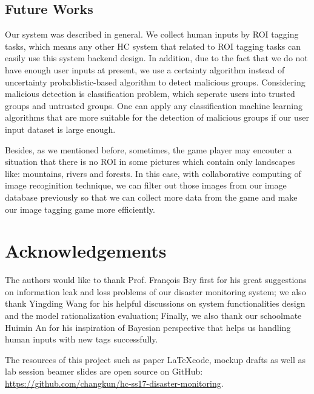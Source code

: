 \subsection{Future Works}

Our system was described in general. We collect human inputs by ROI tagging tasks, 
which means any other HC system that related to ROI tagging tasks can easily use this system backend design.
In addition, due to the fact that we do not have enough user inputs at present, we use a certainty algorithm instead of 
uncertainty probablistic-based algorithm to detect malicious groups. 
Considering malicious detection is classification problem, which seperate users into trusted groups and untrusted groups. 
One can apply any classification machine learning algorithms that are more suitable for the detection of malicious groups 
if our user input dataset is large enough.

Besides, as we mentioned before, sometimes, the game player may encouter a situation that 
there is no ROI in some pictures which contain only landscapes like: mountains, rivers and forests.
In this case, with collaborative computing of image recoginition technique, we can filter out those images 
from our image database previously so that we can collect more data from the game and 
make our image tagging game more efficiently.

\section*{Acknowledgements}
The authors would like to thank Prof. Fran\c{c}ois Bry first for
his great suggestions on information leak and loss problems of our disaster monitoring system;
we also thank Yingding Wang for his helpful discussions on system functionalities design 
and the model rationalization evaluation;
Finally, we also thank our schoolmate Huimin An for his inspiration of Bayesian perspective that
helps us handling human inputs with new tags successfully.

The resources of this project such as paper \LaTeX code, mockup drafts as well as
lab session beamer slides are open source on GitHub: \\
\url{https://github.com/changkun/hc-ss17-disaster-monitoring}.
